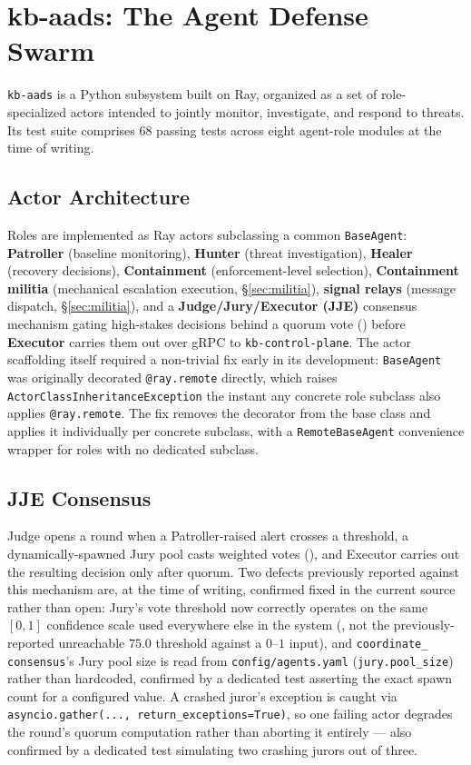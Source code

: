 \documentclass{article}
\begin{document}
\section{kb-aads: The Agent Defense Swarm}
\label{sec:aads}

\texttt{kb-aads} is a Python subsystem built on Ray, organized as a set
of role-specialized actors intended to jointly monitor, investigate,
and respond to threats. Its test suite comprises 68 passing tests
across eight agent-role modules at the time of writing.

\subsection{Actor Architecture}

Roles are implemented as Ray actors subclassing a common
\texttt{BaseAgent}: \textbf{Patroller} (baseline monitoring),
\textbf{Hunter} (threat investigation), \textbf{Healer} (recovery
decisions), \textbf{Containment} (enforcement-level selection),
\textbf{Containment militia} (mechanical escalation execution,
\S\ref{sec:militia}), \textbf{signal relays} (message dispatch,
\S\ref{sec:militia}), and a \textbf{Judge/Jury/Executor (JJE)}
consensus mechanism gating high-stakes decisions behind a quorum vote
() before \textbf{Executor} carries them out over gRPC
to \texttt{kb-control-plane}. The actor scaffolding itself required a
non-trivial fix early in its development: \texttt{BaseAgent} was
originally decorated \texttt{@ray.remote} directly, which raises
\texttt{ActorClassInheritanceException} the instant any concrete role
subclass also applies \texttt{@ray.remote}. The fix removes the
decorator from the base class and applies it individually per concrete
subclass, with a \texttt{RemoteBaseAgent} convenience wrapper for roles
with no dedicated subclass.

\subsection{JJE Consensus}
\label{sec:jje}

Judge opens a round when a Patroller-raised alert crosses a threshold,
a dynamically-spawned Jury pool casts weighted votes
(), and Executor carries out the resulting decision
only after quorum. Two defects previously reported against this
mechanism are, at the time of writing, confirmed fixed in the current
source rather than open: Jury's vote threshold now correctly operates
on the same $[0,1]$ confidence scale used everywhere else in the system
(, not the previously-reported unreachable
$75.0$ threshold against a $0$--$1$ input), and \texttt{coordinate\_
consensus}'s Jury pool size is read from \texttt{config/agents.yaml}
(\texttt{jury.pool\_size}) rather than hardcoded, confirmed by a
dedicated test asserting the exact spawn count for a configured value.
A crashed juror's exception is caught via
\texttt{asyncio.gather(..., return\_exceptions=True)}, so one failing
actor degrades the round's quorum computation rather than aborting it
entirely --- also confirmed by a dedicated test simulating two
crashing jurors out of three.
\end{document}
